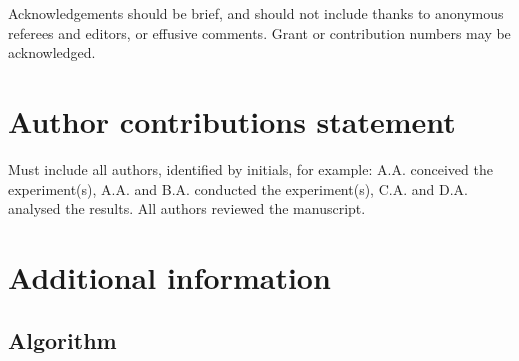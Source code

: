 \documentclass[fleqn,10pt]{wlscirep}
\begin{document}
	Acknowledgements should be brief, and should not include thanks to anonymous referees and editors, or effusive comments. Grant or contribution numbers may be acknowledged.
	
	\section*{Author contributions statement}
	
	Must include all authors, identified by initials, for example:
	A.A. conceived the experiment(s),  A.A. and B.A. conducted the experiment(s), C.A. and D.A. analysed the results.  All authors reviewed the manuscript. 
	
	\section*{Additional information}
	
	\subsection*{Algorithm}
	\label{algorithms}
	
\end{document}
